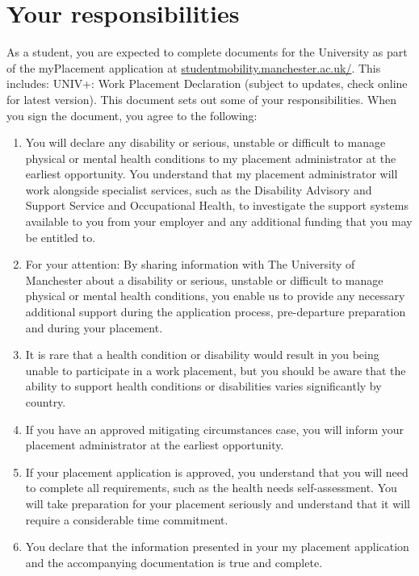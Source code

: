 \documentclass[
]{book}
\providecommand{\tightlist}{%
  \setlength{\itemsep}{0pt}\setlength{\parskip}{0pt}}
\begin{document}
\chapter{Your responsibilities}\label{you}

As a student, you are expected to complete documents for the University as part of the myPlacement application at \href{https://studentmobility.manchester.ac.uk/}{studentmobility.manchester.ac.uk/}. This includes: UNIV+: Work Placement Declaration (subject to updates, check online for latest version). This document sets out some of your responsibilities. When you sign the document, you agree to the following:

\begin{enumerate}
\def\labelenumi{\arabic{enumi}.}
\tightlist
\item
  You will declare any disability or serious, unstable or difficult to manage physical or mental health conditions to my placement administrator at the earliest opportunity. You understand that my placement administrator will work alongside specialist services, such as the Disability Advisory and Support Service and Occupational Health, to investigate the support systems available to you from your employer and any additional funding that you may be entitled to.
\item
  For your attention: By sharing information with The University of Manchester about a disability or serious, unstable or difficult to manage physical or mental health conditions, you enable us to provide any necessary additional support during the application process, pre-departure preparation and during your placement.
\item
  It is rare that a health condition or disability would result in you being unable to participate in a work placement, but you should be aware that the ability to support health conditions or disabilities varies significantly by country.
\item
  If you have an approved mitigating circumstances case, you will inform your placement administrator at the earliest opportunity.
\item
  If your placement application is approved, you understand that you will need to complete all requirements, such as the health needs self-assessment. You will take preparation for your placement seriously and understand that it
  will require a considerable time commitment.
\item
  You declare that the information presented in your my placement application and the accompanying documentation is true and complete.
\end{enumerate}

  
\end{document}
